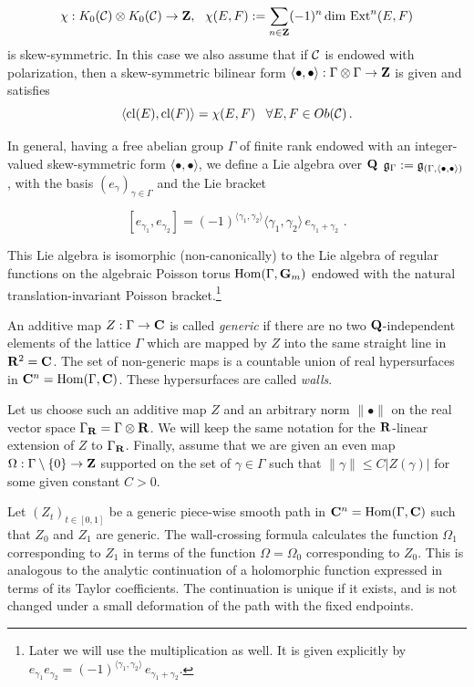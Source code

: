 \documentclass[12pt]{article}
\begin{document}
$$\chi:K_0({\mathcal C})\otimes K_0({\mathcal C})\to {\bf Z},\,\,\,\,\chi(E,F):=\sum_{n\in {\bf Z}} (-1)^n \dim \, \operatorname{Ext}^n(E,F)$$
is skew-symmetric.
In this case we also assume that if ${\mathcal C}$ is endowed with polarization, then a skew-symmetric bilinear form
$\langle\bullet,\bullet\rangle: \Gamma\otimes \Gamma\to {\bf Z}$ is given and satisfies
$$\langle \operatorname{cl}(E),\operatorname{cl}(F)\rangle=\chi(E,F)\,\,\,\,\,\forall E,F\in Ob({\mathcal C})\,.$$

In general, having a free abelian group $\Gamma$ of finite rank endowed with an integer-valued skew-symmetric form $\langle\bullet,\bullet\rangle$, we
define a Lie algebra over ${\bf Q}$ ${\mathfrak g}_{\Gamma}:={\mathfrak g}_{(\Gamma,\langle\bullet,\bullet\rangle)}$, with the basis $(e_\gamma)_{\gamma\in \Gamma}$ and the Lie bracket

 $$ [ e_{\gamma_1}, e_{\gamma_2}]=(-1)^{\langle \gamma_1,\gamma_2\rangle}\langle
\gamma_1,\gamma_2\rangle\,e_{\gamma_1+\gamma_2}\,\,.$$


This Lie algebra is isomorphic (non-canonically) to the Lie algebra of regular functions
on the algebraic Poisson torus ${ \operatorname{Hom}}(\Gamma, {{\bf G}}_m)$ endowed with the natural translation-invariant Poisson bracket.\footnote{Later we will use the multiplication  as well.
It is given explicitly by
$e_{\gamma_1}e_{\gamma_2}=(-1)^{\langle \gamma_1,\gamma_2\rangle}\,e_{\gamma_1+\gamma_2}.$}


An additive map $Z:\Gamma\to {\bf C}$ is called {\it generic}
if  there are no two ${\bf Q}$-independent elements of the lattice $\Gamma$ which are mapped by $Z$
into the same straight line in ${\bf R}^2={\bf C}$. The set of non-generic maps is a countable union of real hypersurfaces in ${\bf C}^n=\operatorname{Hom}(\Gamma, {\bf C})$. These hypersurfaces are called {\it walls}.

Let us choose such an additive map $Z$ and an arbitrary norm $\parallel \bullet \parallel$ on the real vector space $\Gamma_{{\bf R}}=\Gamma\otimes {\bf R}$. We will keep the same notation for the ${\bf R}$-linear extension
of $Z$ to $\Gamma_{{\bf R}}$.  Finally, assume that we are given an even map $\Omega:\Gamma\setminus \{0\}\to {\bf Z}$
supported on the set  of $\gamma\in \Gamma$ such that $\parallel \gamma \parallel\le C|Z(\gamma) |$ for some given constant $C>0$.

Let $(Z_t)_{t\in [0,1]}$ be a generic piece-wise smooth path in ${\bf C}^n=\operatorname{Hom}(\Gamma, {\bf C})$ such that $Z_0$ and $Z_1$ are generic. The wall-crossing formula calculates the function $\Omega_1$ corresponding to $Z_1$ in terms of the function $\Omega=\Omega_0$ corresponding to $Z_0$.  This is analogous to the analytic continuation of a holomorphic function expressed in terms of its Taylor coefficients. The continuation is unique if it exists, and is not changed under a small deformation of the path with the fixed endpoints.
\end{document}
